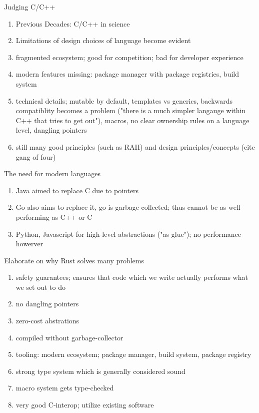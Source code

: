 \documentclass{article}
\begin{document}
Judging C/C++
\begin{enumerate}
    \item Previous Decades: C/C++ in science
    \item Limitations of design choices of language become evident
    \item fragmented ecosystem; good for competition; bad for developer experience
    \item modern features missing: package manager with package registries, build system
    \item technical details; mutable by default, templates vs generics, backwards
        compatiblity becomes a
        problem ("there is a much simpler langauge within C++ that tries to get out"),
        macros, no clear
        ownership rules on a language level, dangling pointers
    \item still many good principles (such as RAII) and design principles/concepts (cite
        gang of four)
\end{enumerate}

The need for modern languages
\begin{enumerate}
    \item Java aimed to replace C due to pointers
    \item Go also aims to replace it, go is garbage-collected; thus cannot be as
        well-performing as C++ or C
    \item Python, Javascript for high-level abstractions ("as glue"); no performance howerver
\end{enumerate}

Elaborate on why Rust solves many problems
\begin{enumerate}
    \item safety guarantees; ensures that code which we write actually performs what we
        set out to do
    \item no dangling pointers
    \item zero-cost abstrations
    \item compiled without garbage-collector
    \item tooling: modern ecosystem; package manager, build system, package registry
    \item strong type system which is generally considered sound
    \item macro system gets type-checked
    \item very good C-interop; utilize existing software
\end{enumerate}
\end{document}
